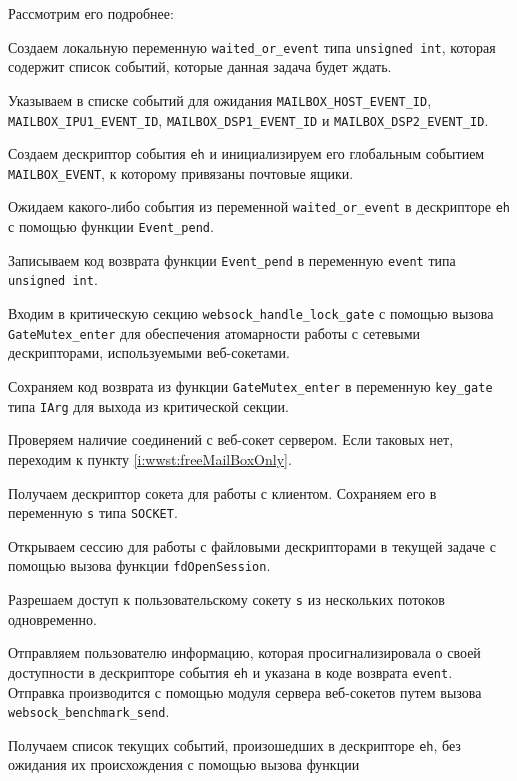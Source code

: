 Рассмотрим его подробнее:
\begin{enumerate_step}
    \item \label{i:wwst:begin} Создаем локальную переменную \verb|waited_or_event|
    типа \verb|unsigned int|, которая содержит список событий, которые данная
    задача будет ждать.
    \item Указываем в списке событий для ожидания \verb|MAILBOX_HOST_EVENT_ID|,
    \verb|MAILBOX_IPU1_EVENT_ID|, \verb|MAILBOX_DSP1_EVENT_ID| и
    \verb|MAILBOX_DSP2_EVENT_ID|.
    \item Создаем дескриптор события \verb|eh| и инициализируем его
    глобальным событием \verb|MAILBOX_EVENT|, к которому привязаны почтовые
    ящики.
    \item Ожидаем какого-либо события из переменной \verb|waited_or_event|
    в дескрипторе \verb|eh| с помощью функции \verb|Event_pend|.
    \item Записываем код возврата функции \verb|Event_pend| в переменную
    \verb|event| типа \verb|unsigned int|.
    \item Входим в критическую секцию \verb|websock_handle_lock_gate| с помощью
    вызова \verb|GateMutex_enter| для обеспечения атомарности работы с
    сетевыми дескрипторами, используемыми веб-сокетами.
    \item Сохраняем код возврата из функции \verb|GateMutex_enter| в переменную
    \verb|key_gate| типа \verb|IArg| для выхода из критической секции.
    \item Проверяем наличие соединений с веб-сокет сервером. Если таковых нет,
    переходим к пункту \ref{i:wwst:freeMailBoxOnly}.
    \item Получаем дескриптор сокета для работы с клиентом. Сохраняем его в
    переменную \verb|s| типа \verb|SOCKET|.
    \item Открываем сессию для работы с файловыми дескрипторами в текущей
    задаче с помощью вызова функции \verb|fdOpenSession|.
    \item Разрешаем доступ к пользовательскому сокету \verb|s| из нескольких
    потоков одновременно.
    \item \label{i:wwst:send} Отправляем пользователю информацию, которая
    просигнализировала о своей доступности в дескрипторе события \verb|eh|
    и указана в коде возврата \verb|event|. Отправка производится с помощью
    модуля сервера веб-сокетов путем вызова \verb|websock_benchmark_send|.
    \item Получаем список текущих событий, произошедших в дескрипторе
    \verb|eh|, без ожидания их происхождения с помощью вызова функции

\end{enumerate_step}
